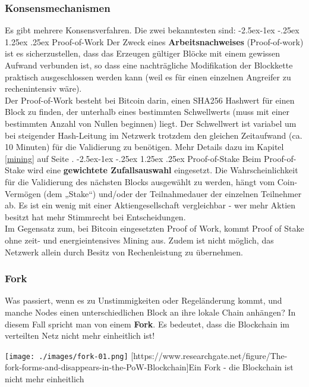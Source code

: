 \documentclass[10pt,a4paper,titlepage]{article}
\makeatletter
\renewcommand\paragraph{\@startsection{paragraph}{4}{\z@}%
            {-2.5ex\@plus -1ex \@minus -.25ex}%
            {1.25ex \@plus .25ex}%
            {\normalfont\normalsize\bfseries}}
\makeatother
\begin{document}
\subsubsection{Konsensmechanismen}
Es gibt mehrere Konsensverfahren. Die zwei bekanntesten sind:
\paragraph{Proof-of-Work}
Der Zweck eines \textbf{Arbeitsnachweises} (Proof-of-work) ist es sicherzustellen, dass das Erzeugen gültiger Blöcke mit einem gewissen Aufwand verbunden ist, so dass eine nachträgliche Modifikation der Blockkette praktisch ausgeschlossen werden kann (weil es für einen einzelnen Angreifer zu rechenintensiv wäre).\\
Der Proof-of-Work besteht bei Bitcoin darin, einen SHA256 Hashwert für einen Block zu finden, der unterhalb eines bestimmten Schwellwerts (muss mit einer bestimmten Anzahl von Nullen beginnen) liegt. Der Schwellwert ist variabel um bei steigender Hash-Leitung im Netzwerk trotzdem den gleichen Zeitaufwand (ca. 10 Minuten) für die Validierung zu benötigen. Mehr Details dazu im Kapitel \ref{mining} auf Seite \pageref{mining}.
\paragraph{Proof-of-Stake}
Beim Proof-of-Stake wird eine \textbf{gewichtete Zufallsauswahl} eingesetzt. Die Wahrscheinlichkeit für die Validierung des nächsten Blocks ausgewählt zu werden, hängt vom Coin-Vermögen (dem „Stake“) und/oder der Teilnahmedauer der einzelnen Teilnehmer ab.  Es ist ein wenig mit einer Aktiengesellschaft vergleichbar - wer mehr Aktien besitzt hat mehr Stimmrecht bei Entscheidungen.\\Im Gegensatz zum, bei Bitcoin eingesetzten Proof of Work, kommt Proof of Stake ohne zeit- und energieintensives Mining aus. Zudem ist nicht möglich, das Netzwerk allein durch Besitz von Rechenleistung zu übernehmen.


\subsubsection{Fork}
Was passiert, wenn es zu Unstimmigkeiten oder Regeländerung kommt, und manche Nodes einen unterschiedlichen Block an ihre lokale Chain anhängen? In diesem Fall spricht man von einem \textbf{Fork}. Es bedeutet, dass die Blockchain im verteilten Netz nicht mehr einheitlich ist!
\begin{center}
\texttt{[image: ./images/fork-01.png]}
[https://www.researchgate.net/figure/The-fork-forms-and-disappears-in-the-PoW-Blockchain]{Ein Fork - die Blockchain ist nicht mehr einheitlich}
\end{center}
\end{document}
